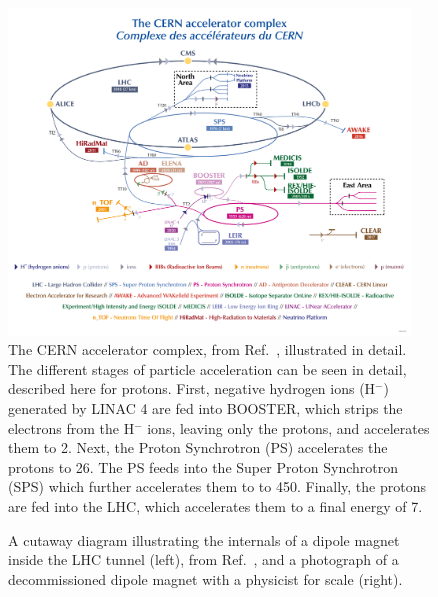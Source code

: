 \begin{figure}[!htb]
    \centering
    \includegraphics[width=0.95\textwidth]{fig/lhc/lhc_complex.png}
    \caption[The CERN accelerator complex illustrated in detail.]{
        The CERN accelerator complex, from Ref.~\cite{Lopienska:2800984}, illustrated in detail. 
        The different stages of particle acceleration can be seen in detail, described here for protons. 
        First, negative hydrogen ions (H$^-$) generated by LINAC 4 are fed into BOOSTER, which strips the electrons from the H$^-$ ions, leaving only the protons, and accelerates them to 2\GeV. 
        Next, the Proton Synchrotron (PS) accelerates the protons to 26\GeV. 
        The PS feeds into the Super Proton Synchrotron (SPS) which further accelerates them to to 450\GeV. 
        Finally, the protons are fed into the LHC, which accelerates them to a final energy of 7\TeV. 
    }
    \label{fig:cern_complex}
\end{figure}

\begin{figure}[htb]
    \centering
    \quad
    \caption[A cutaway diagram illustrating the internals of a dipole magnet inside the LHC tunnel and a photograph of a decommissioned dipole magnet with a physicist for scale]{
        A cutaway diagram illustrating the internals of a dipole magnet inside the LHC tunnel (left), from Ref.~\cite{Dominguez:1741036}, and a photograph of a decommissioned dipole magnet with a physicist for scale (right).
    }
    \label{fig:lhc_dipole}
\end{figure}

